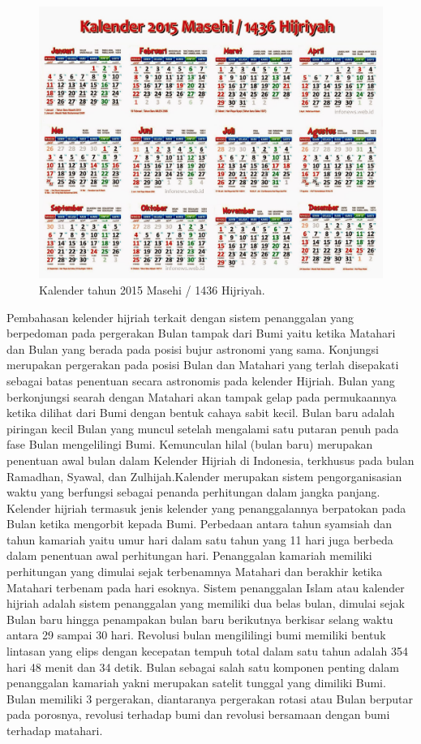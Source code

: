    \begin{figure}[ht]
    \centerline{\includegraphics[width=1\textwidth]{figures/Kalender_2015.JPG}}
    \caption{Kalender tahun 2015 Masehi / 1436 Hijriyah.}
    \label{Kalender_2015}
    \end{figure}
    
Pembahasan kelender hijriah terkait dengan sistem penanggalan yang berpedoman pada pergerakan Bulan tampak dari Bumi yaitu ketika Matahari dan Bulan yang berada pada posisi bujur astronomi yang sama. Konjungsi merupakan pergerakan pada posisi Bulan dan Matahari yang terlah disepakati sebagai batas penentuan secara astronomis pada kelender Hijriah.
  Bulan yang berkonjungsi searah dengan Matahari akan tampak gelap pada permukaannya ketika dilihat dari Bumi dengan bentuk cahaya sabit kecil. Bulan baru adalah piringan kecil Bulan yang muncul setelah mengalami satu putaran penuh pada fase Bulan mengelilingi Bumi.
  Kemunculan hilal (bulan baru) merupakan penentuan awal bulan dalam Kelender Hijriah di Indonesia, terkhusus pada bulan Ramadhan, Syawal, dan Zulhijah.Kalender merupakan sistem pengorganisasian waktu yang berfungsi sebagai penanda perhitungan dalam jangka panjang. Kelender hijriah termasuk jenis kelender yang penanggalannya berpatokan pada Bulan ketika mengorbit kepada Bumi.
  Perbedaan antara tahun syamsiah dan tahun kamariah yaitu umur hari dalam satu tahun yang 11 hari juga berbeda dalam penentuan awal perhitungan hari. Penanggalan kamariah memiliki perhitungan yang dimulai sejak terbenamnya Matahari dan berakhir ketika Matahari terbenam pada hari esoknya.
  Sistem penanggalan Islam atau kalender hijriah adalah sistem penanggalan yang memiliki dua belas bulan, dimulai sejak Bulan baru hingga penampakan bulan baru berikutnya berkisar selang waktu antara 29 sampai 30 hari. Revolusi bulan mengililingi bumi memiliki bentuk lintasan yang elips dengan kecepatan tempuh total dalam satu tahun adalah 354 hari 48 menit dan 34 detik.
  Bulan sebagai salah satu komponen penting dalam penanggalan kamariah yakni merupakan satelit tunggal yang dimiliki Bumi. Bulan memiliki 3 pergerakan, diantaranya pergerakan rotasi atau Bulan berputar pada porosnya, revolusi terhadap bumi dan revolusi bersamaan dengan bumi terhadap matahari.

